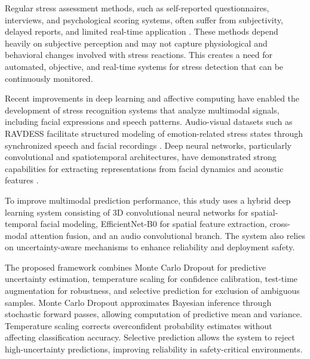 \documentclass[conference]{IEEEtran}
\begin{document}
Regular stress assessment methods, such as self-reported questionnaires, interviews, and psychological scoring systems, often suffer from subjectivity, delayed reports, and limited real-time application \cite{ref4}. These methods depend heavily on subjective perception and may not capture physiological and behavioral changes involved with stress reactions. This creates a need for automated, objective, and real-time systems for stress detection that can be continuously monitored. 

Recent improvements in deep learning and affective computing have enabled the development of stress recognition systems that analyze multimodal signals, including facial expressions and speech patterns. Audio-visual datasets such as RAVDESS facilitate structured modeling of emotion-related stress states through synchronized speech and facial recordings \cite{ref5}. Deep neural networks, particularly convolutional and spatiotemporal architectures, have demonstrated strong capabilities for extracting representations from facial dynamics and acoustic features \cite{ref6,ref7,ref8}. 

To improve multimodal prediction performance, this study uses a hybrid deep learning system consisting of 3D convolutional neural networks for spatial-temporal facial modeling, EfficientNet-B0 for spatial feature extraction, cross-modal attention fusion, and an audio convolutional branch. The system also relies on uncertainty-aware mechanisms to enhance reliability and deployment safety.

The proposed framework combines Monte Carlo Dropout for predictive uncertainty estimation, temperature scaling for confidence calibration, test-time augmentation for robustness, and selective prediction for exclusion of ambiguous samples. Monte Carlo Dropout approximates Bayesian inference through stochastic forward passes, allowing computation of predictive mean and variance. Temperature scaling corrects overconfident probability estimates without affecting classification accuracy. Selective prediction allows the system to reject high-uncertainty predictions, improving reliability in safety-critical environments. 
\end{document}
